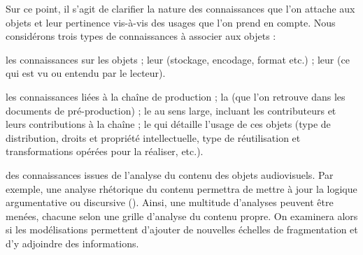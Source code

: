 Sur ce point, il s'agit de clarifier la nature des connaissances que l'on attache aux objets et leur pertinence vis-à-vis des usages que l'on prend en compte. 
Nous considérons trois types de connaissances à associer aux objets : 
\begin{liste}
	\item les connaissances sur les objets ; leur  (stockage, encodage, format etc.) ; leur  (ce qui est vu ou entendu par le lecteur).

	\item les connaissances liées à la chaîne de production ; la  (que l'on retrouve dans les documents de pré-production) ; le  au sens large, incluant les contributeurs et leurs contributions à la chaîne ; le   qui détaille l'usage de ces objets (type de distribution, droits et propriété intellectuelle, type de réutilisation et transformations opérées pour la réaliser, etc.).

	\item des connaissances issues de l'analyse du contenu des objets audiovisuels. 
	Par exemple, une analyse rhétorique du contenu permettra de mettre à jour la logique argumentative ou discursive (\cite{Gaillard2008}). 
	Ainsi, une multitude d'analyses peuvent être menées, chacune selon une grille d'analyse du contenu propre. 
	On examinera alors si les modélisations permettent d'ajouter de nouvelles échelles de fragmentation et d'y adjoindre des informations.
\end{liste}


